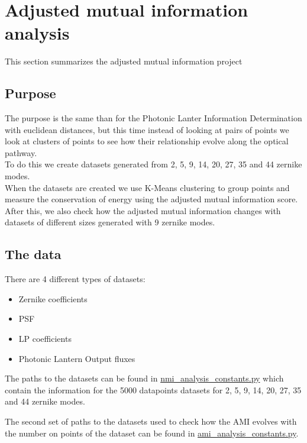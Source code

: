 \section{Adjusted mutual information analysis}
	This section summarizes the adjusted mutual information project
	
	
	\subsection{Purpose}
	
		The purpose is the same than for the Photonic Lanter Information Determination with euclidean distances, but this time instead of looking at pairs of points we look at clusters of points to see how their relationship evolve along the optical pathway.\\
		
		To do this we create datasets generated from 2, 5, 9, 14, 20, 27, 35 and 44 zernike modes.\\
		
		When the datasets are created we use K-Means clustering to group points and measure the conservation of energy using the adjusted mutual information score.\\
		
		After this, we also check how the adjusted mutual information changes with datasets of different sizes generated with 9 zernike modes.
		
		
	\subsection{The data}
		There are 4 different types of datasets:
		\begin{itemize}
			\item Zernike coefficients
			\item PSF
			\item LP coefficients
			\item Photonic Lantern Output fluxes
		\end{itemize}
		
		The paths to the datasets can be found in \href{https://github.com/Dacarpe03/PLImageReconstruction/blob/main/Utils/nmi_analysis_constants.py}{nmi\_analysis\_constants.py} which contain the information for the 5000 datapoints datasets for 2, 5, 9, 14, 20, 27, 35 and 44 zernike modes.
		
		The second set of paths to the datasets used to check how the AMI evolves with the number on points of the dataset can be found in \href{https://github.com/Dacarpe03/PLImageReconstruction/blob/main/Utils/ami_analysis_constants.py}{ami\_analysis\_constants.py}.
		

